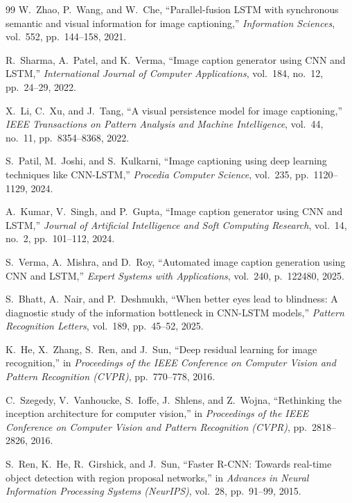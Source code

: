 \documentclass{article}
\begin{document}
\begin{thebibliography}{99}
W.~Zhao, P.~Wang, and W.~Che,
\newblock ``Parallel-fusion {LSTM} with synchronous semantic and visual information for image captioning,''
\newblock \textit{Information Sciences}, vol.~552, pp.~144--158, 2021.

R.~Sharma, A.~Patel, and K.~Verma,
\newblock ``Image caption generator using {CNN} and {LSTM},''
\newblock \textit{International Journal of Computer Applications}, vol.~184, no.~12, pp.~24--29, 2022.

X.~Li, C.~Xu, and J.~Tang,
\newblock ``A visual persistence model for image captioning,''
\newblock \textit{IEEE Transactions on Pattern Analysis and Machine Intelligence}, vol.~44, no.~11, pp.~8354--8368, 2022.

S.~Patil, M.~Joshi, and S.~Kulkarni,
\newblock ``Image captioning using deep learning techniques like {CNN-LSTM},''
\newblock \textit{Procedia Computer Science}, vol.~235, pp.~1120--1129, 2024.

A.~Kumar, V.~Singh, and P.~Gupta,
\newblock ``Image caption generator using {CNN} and {LSTM},''
\newblock \textit{Journal of Artificial Intelligence and Soft Computing Research}, vol.~14, no.~2, pp.~101--112, 2024.

S.~Verma, A.~Mishra, and D.~Roy,
\newblock ``Automated image caption generation using {CNN} and {LSTM},''
\newblock \textit{Expert Systems with Applications}, vol.~240, p.~122480, 2025.

S.~Bhatt, A.~Nair, and P.~Deshmukh,
\newblock ``When better eyes lead to blindness: A diagnostic study of the information bottleneck in {CNN-LSTM} models,''
\newblock \textit{Pattern Recognition Letters}, vol.~189, pp.~45--52, 2025.

K.~He, X.~Zhang, S.~Ren, and J.~Sun,
\newblock ``Deep residual learning for image recognition,''
\newblock in \textit{Proceedings of the IEEE Conference on Computer Vision and Pattern Recognition (CVPR)}, pp.~770--778, 2016.

C.~Szegedy, V.~Vanhoucke, S.~Ioffe, J.~Shlens, and Z.~Wojna,
\newblock ``Rethinking the inception architecture for computer vision,''
\newblock in \textit{Proceedings of the IEEE Conference on Computer Vision and Pattern Recognition (CVPR)}, pp.~2818--2826, 2016.

S.~Ren, K.~He, R.~Girshick, and J.~Sun,
\newblock ``Faster {R-CNN}: Towards real-time object detection with region proposal networks,''
\newblock in \textit{Advances in Neural Information Processing Systems (NeurIPS)}, vol.~28, pp.~91--99, 2015.


\end{thebibliography}
\end{document}
